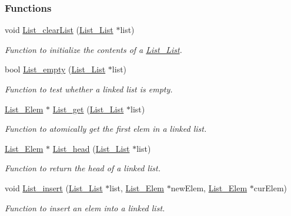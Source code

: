\subsubsection*{Functions}
\begin{DoxyCompactItemize}
\item 
void \hyperlink{_list_8h_a32d4e53da70142cec310cfa0006f146a}{List\+\_\+clear\+List} (\hyperlink{struct_list___list}{List\+\_\+\+List} $\ast$list)
\begin{DoxyCompactList}\small\item\em Function to initialize the contents of a \hyperlink{struct_list___list}{List\+\_\+\+List}. \end{DoxyCompactList}\item 
bool \hyperlink{_list_8h_aa776684c49d2b438bd1da048270f2e7c}{List\+\_\+empty} (\hyperlink{struct_list___list}{List\+\_\+\+List} $\ast$list)
\begin{DoxyCompactList}\small\item\em Function to test whether a linked list is empty. \end{DoxyCompactList}\item 
\hyperlink{struct_list___elem}{List\+\_\+\+Elem} $\ast$ \hyperlink{_list_8h_ac8c9babb4481314e3f0cce444f7fbade}{List\+\_\+get} (\hyperlink{struct_list___list}{List\+\_\+\+List} $\ast$list)
\begin{DoxyCompactList}\small\item\em Function to atomically get the first elem in a linked list. \end{DoxyCompactList}\item 
\hyperlink{struct_list___elem}{List\+\_\+\+Elem} $\ast$ \hyperlink{_list_8h_aa05d55142bf29f863f330d1ab77e6544}{List\+\_\+head} (\hyperlink{struct_list___list}{List\+\_\+\+List} $\ast$list)
\begin{DoxyCompactList}\small\item\em Function to return the head of a linked list. \end{DoxyCompactList}\item 
void \hyperlink{_list_8h_a0725acc51893e377f5ee9225dd6fcd26}{List\+\_\+insert} (\hyperlink{struct_list___list}{List\+\_\+\+List} $\ast$list, \hyperlink{struct_list___elem}{List\+\_\+\+Elem} $\ast$new\+Elem, \hyperlink{struct_list___elem}{List\+\_\+\+Elem} $\ast$cur\+Elem)
\begin{DoxyCompactList}\small\item\em Function to insert an elem into a linked list. \end{DoxyCompactList}\item 

\end{DoxyCompactItemize}
